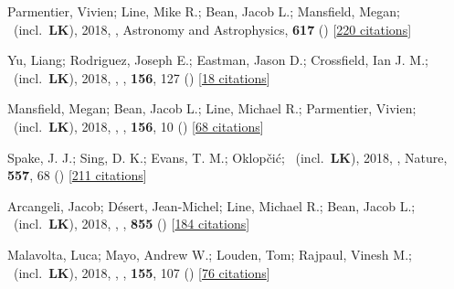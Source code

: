 \item[{\color{numcolor}\scriptsize22}] Parmentier, Vivien; Line, Mike R.; Bean, Jacob L.; Mansfield, Megan; \etal\ (incl.\ \textbf{LK}), 2018, , Astronomy and Astrophysics, \textbf{617} () [\href{https://ui.adsabs.harvard.edu/abs/2018A&A...617A.110P}{220 citations}]

\item[{\color{numcolor}\scriptsize21}] Yu, Liang; Rodriguez, Joseph E.; Eastman, Jason D.; Crossfield, Ian J. M.; \etal\ (incl.\ \textbf{LK}), 2018, , \aj, \textbf{156}, 127 () [\href{https://ui.adsabs.harvard.edu/abs/2018AJ....156..127Y}{18 citations}]

\item[{\color{numcolor}\scriptsize20}] Mansfield, Megan; Bean, Jacob L.; Line, Michael R.; Parmentier, Vivien; \etal\ (incl.\ \textbf{LK}), 2018, , \aj, \textbf{156}, 10 () [\href{https://ui.adsabs.harvard.edu/abs/2018AJ....156...10M}{68 citations}]

\item[{\color{numcolor}\scriptsize19}] Spake, J. J.; Sing, D. K.; Evans, T. M.; Oklop{\v{c}}i{\'c}; \etal\ (incl.\ \textbf{LK}), 2018, , Nature, \textbf{557}, 68 () [\href{https://ui.adsabs.harvard.edu/abs/2018Natur.557...68S}{211 citations}]

\item[{\color{numcolor}\scriptsize18}] Arcangeli, Jacob; D{\'e}sert, Jean-Michel; Line, Michael R.; Bean, Jacob L.; \etal\ (incl.\ \textbf{LK}), 2018, , \apj, \textbf{855} () [\href{https://ui.adsabs.harvard.edu/abs/2018ApJ...855L..30A}{184 citations}]

\item[{\color{numcolor}\scriptsize17}] Malavolta, Luca; Mayo, Andrew W.; Louden, Tom; Rajpaul, Vinesh M.; \etal\ (incl.\ \textbf{LK}), 2018, , \aj, \textbf{155}, 107 () [\href{https://ui.adsabs.harvard.edu/abs/2018AJ....155..107M}{76 citations}]

